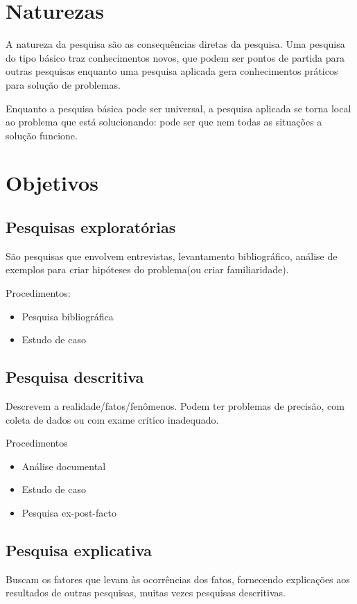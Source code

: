 \section{Naturezas}
A natureza da pesquisa são as consequências diretas da pesquisa. Uma pesquisa do tipo básico traz conhecimentos novos, que podem ser pontos de partida para outras pesquisas enquanto uma pesquisa aplicada gera conhecimentos práticos para solução de problemas.

Enquanto a pesquisa básica pode ser universal, a pesquisa aplicada se torna local ao problema que está solucionando: pode ser que nem todas as situações a solução funcione.


\section{Objetivos}
\subsection{Pesquisas exploratórias}
São pesquisas que envolvem entrevistas, levantamento bibliográfico, análise de exemplos para criar hipóteses do problema(ou criar familiaridade).

Procedimentos:
\begin{itemize}
    \item Pesquisa bibliográfica
    \item Estudo de caso
\end{itemize}

\subsection{Pesquisa descritiva}
Descrevem a realidade/fatos/fenômenos. Podem ter problemas de precisão, com coleta de dados ou com exame crítico inadequado.

Procedimentos
\begin{itemize}
    \item Análise documental
    \item Estudo de caso
    \item Pesquisa ex-post-facto
\end{itemize}

\subsection{Pesquisa explicativa}
Buscam os fatores que levam às ocorrências dos fatos, fornecendo explicações aos resultados de outras pesquisas, muitas vezes pesquisas descritivas.

